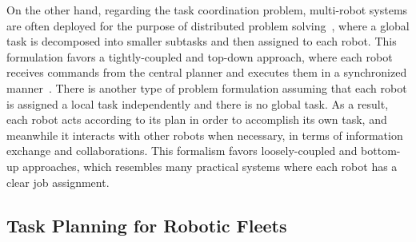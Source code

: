 On the other hand, regarding the task coordination problem, multi-robot systems are often deployed for the purpose of {distributed problem solving}~\cite{durfee2006distributed}, where a global task is decomposed into smaller subtasks and then assigned to each robot. This formulation favors a {tightly-coupled} and {top-down} approach, where each robot receives commands from the central planner and executes them in a synchronized manner~\cite{kok2006collaborative}.
There is another type of problem formulation assuming  that each robot is assigned a local task independently and there is no global task. As a result, each robot acts according to its plan in order to accomplish its  own task, and meanwhile it interacts with other robots when necessary, in terms of information exchange and collaborations. This formalism favors {loosely-coupled} and {bottom-up} approaches, which resembles many practical systems where each robot has a clear job assignment.



\subsection{Task Planning for Robotic Fleets}

